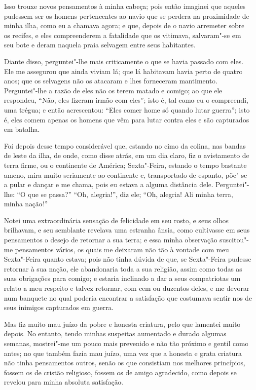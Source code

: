 Isso trouxe novos pensamentos à minha cabeça; pois então imaginei que
aqueles pudessem ser os homens pertencentes ao navio que se perdera na
proximidade de minha ilha, como eu a chamava agora; e que, depois de o
navio arremeter sobre os recifes, e eles compreenderem a fatalidade que
os vitimava, salvaram"-se em seu bote e deram naquela praia selvagem
entre seus habitantes.

Diante disso, perguntei"-lhe mais criticamente o que se havia passado com
eles. Ele me assegurou que ainda viviam lá; que lá habitavam havia perto
de quatro anos; que os selvagens não os atacaram e lhes forneceram
mantimento. Perguntei"-lhe a razão de eles não os terem matado e comigo;
ao que ele respondeu, ``Não, eles fizeram irmão com eles''; isto é, tal
como eu o compreendi, uma trégua; e então acrescentou: ``Eles comer home
só quando lutar guerra''; isto é, eles comem apenas os homens que vêm
para lutar contra eles e são capturados em batalha.

Foi depois desse tempo considerável que, estando no cimo da colina, nas
bandas de leste da ilha, de onde, como disse atrás, em um dia claro, fiz
o avistamento de terra firme, ou o continente de América; Sexta"-Feira,
estando o tempo bastante ameno, mira muito seriamente ao continente e,
transportado de espanto, põe"-se a pular e dançar e me chama, pois eu
estava a alguma distância dele. Perguntei"-lhe: ``O que se passa?'' ``Oh,
alegria!'', diz ele; ``Oh, alegria! Ali minha terra, minha nação!''

Notei uma extraordinária sensação de felicidade em seu rosto, e seus
olhos brilhavam, e seu semblante revelava uma estranha ânsia, como
cultivasse em seus pensamentos o desejo de retornar a sua terra; e essa
minha observação suscitou"-me pensamentos vários, os quais me deixaram
não tão à vontade com meu Sexta"-Feira quanto estava; pois não tinha
dúvida de que, se Sexta"-Feira pudesse retornar à sua nação, ele
abandonaria toda a sua religião, assim como todas as suas obrigações
para comigo; e estaria inclinado a dar a seus compatriotas um relato a
meu respeito e talvez retornar, com cem ou duzentos deles, e me devorar
num banquete no qual poderia encontrar a satisfação que costumava sentir
nos de seus inimigos capturados em guerra.

Mas fiz muito mau juízo da pobre e honesta criatura, pelo que lamentei
muito depois. No entanto, tendo minhas suspeitas aumentado e durado
algumas semanas, mostrei"-me um pouco mais prevenido e não tão próximo e
gentil como antes; no que também fazia mau juízo, uma vez que a honesta
e grata criatura não tinha pensamentos outros, senão os que consistiam
nos melhores princípios, fossem os de cristão religioso, fossem os de
amigo agradecido, como depois se revelou para minha absoluta satisfação.

